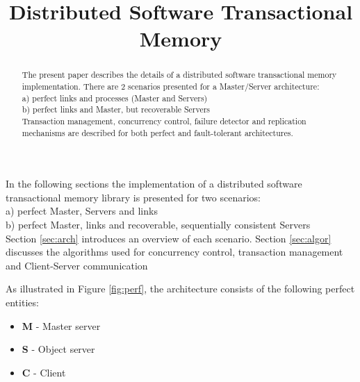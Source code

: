 \documentclass[times, 10pt,twocolumn]{article}
\begin{document}
\title{Distributed Software Transactional Memory}

\maketitle
\thispagestyle{empty}

\begin{abstract}


   The present paper describes the details of a distributed software
   transactional memory implementation.
   There are 2 scenarios presented for a Master/Server architecture: \\
   a) perfect links and processes (Master and Servers) \\
   b) perfect links and Master, but recoverable Servers \\

   Transaction management, concurrency control, failure detector and 
   replication mechanisms are described for both perfect and fault-tolerant
   architectures.
   
\end{abstract}



In the following sections the implementation of a distributed software 
transactional memory library is presented for two scenarios:\\
a) perfect Master, Servers and links\\
b) perfect Master, links and recoverable, sequentially consistent Servers\\

Section \ref{sec:arch} introduces an overview of each scenario. Section 
\ref{sec:algor} discusses the algorithms used for concurrency control, 
transaction management and Client-Server communication


\label{sec:arch}


\label{subsec:perf}
As illustrated in Figure \ref{fig:perf}, the architecture consists of the 
following perfect entities: 
\begin{itemize}
\item {\bf M} - Master server 
\item {\bf S} - Object server
\item {\bf C} - Client      
\end{itemize}
\end{document}
